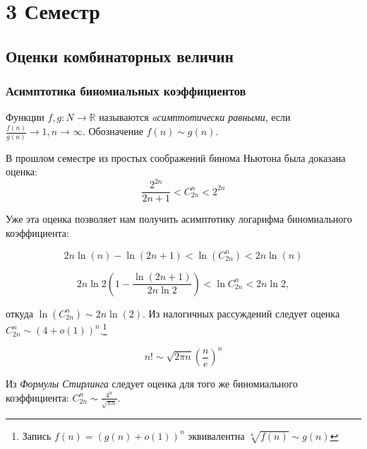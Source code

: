 \section{3 Семестр}

\subsection{Оценки комбинаторных величин}

\subsubsection{Асимптотика биномиальных коэффициентов}

\begin{Def}
	Функции $f, g:N \rightarrow \mathbb{R}$ называются \emph{aсимптотически равными}, если \(\frac{f(n)}{g(n)} \rightarrow 1, n \rightarrow \infty \). Обозначение \(f(n) \sim g(n)\).
\end{Def}


\begin{example}
	В прошлом семестре из простых соображений бинома Ньютона была доказана оценка:
	\[ \frac{2^{2n}}{2n + 1} < C^n_{2n} < 2^{2n} \]
	
	Уже эта оценка позволяет нам получить асимптотику логарифма биномиального коэффициента:
	
	\[ 2n\ln(n) - \ln(2n+1) < \ln(C^n_{2n}) < 2n\ln(n) \]
	
	
	\[2 n \ln 2\left(1-\frac{\ln (2 n+1)}{2 n \ln 2}\right) < \ln C_{2 n}^{n} < 2n \ln 2, \]
	
	
	откуда \( \ln(C^n_{2n}) \sim 2n\ln(2) \).
	Из налогичных рассуждений следует оценка \(C^n_{2n} \sim \left(4 + o(1)\right)^n\).\footnote{Запись $f\left( n\right) = \left( g\left( n\right) + o\left( 1\right) \right) ^n $ эквивалентна $\sqrt[n]{f(n)} \sim g\left( n\right) $}
\end{example}


\begin{theorem}
	\[ n! \sim \sqrt{2\pi n} (\frac{n}{e})^n \]
\end{theorem}

\begin{note}
	Из \emph{Формулы Стирлинга} следует оценка для того же биномиального коэффициента: \(C^n_{2n} \sim \frac{4^n}{\sqrt{\pi n}}\).
\end{note}

